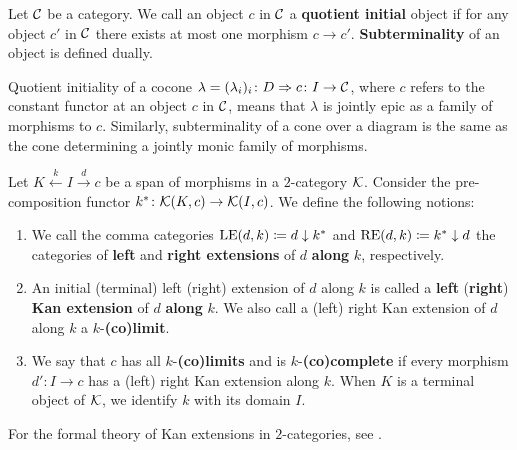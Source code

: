 \begin{definition}
   Let $\mathcal{C}$ be a category. We call an object $c$ in $\mathcal{C}$ a \textbf{quotient initial} object if for any object $c'$ in $\mathcal{C}$ there exists at most one morphism $c\to c'$. \textbf{Subterminality} of an object is defined dually.
\end{definition}
Quotient initiality of a cocone $\lambda = (\lambda_i)_i\colon D\Rightarrow c\colon I\to \mathcal{C}$, where $c$ refers to the constant functor at an object $c$ in $\mathcal{C}$, means that $\lambda$ is jointly epic as a family of morphisms to $c$. Similarly, subterminality of a cone over a diagram is the same as the cone determining a jointly monic family of morphisms.
\begin{definition}
   Let $K\xleftarrow{k}I\xrightarrow{d}c$ be a span of morphisms in a $2$-category $\mathcal{K}$. Consider the pre-composition functor $k^*\colon \mathcal{K}(K,c)\to \mathcal{K}(I,c)$. We define the following notions:
   \begin{enumerate}
       \item We call the comma categories $\mathrm{LE}(d,k) \coloneqq d\downarrow k^*$ and $\mathrm{RE}(d,k)\coloneqq k^*\downarrow d$ the categories of \textbf{left} and \textbf{right extensions} of $d$ \textbf{along} $k$, respectively.
       \item An initial (terminal) left (right) extension of $d$ along $k$ is called a \textbf{left} (\textbf{right}) \textbf{Kan extension} of $d$ \textbf{along} $k$. We also call a (left) right Kan extension of $d$ along $k$ a $k$-\textbf{(co)limit}.
       \item We say that $c$ has all $k$-\textbf{(co)limits} and is $k$-\textbf{(co)complete} if every morphism $d'\colon I\to c$ has a (left) right Kan extension along $k$. When $K$ is a terminal object of $\mathcal{K}$, we identify $k$ with its domain $I$.
   \end{enumerate}
\end{definition}
For the formal theory of Kan extensions in $2$-categories, see \cite{streetYonedaStructures2categories1978}.
